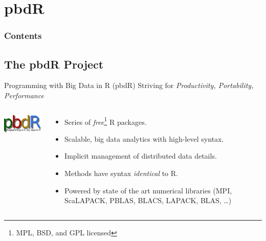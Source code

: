 \section{pbdR}

\hidenum
\begin{frame}[noframenumbering]
\frametitle{Contents}
 \tableofcontents[currentsection,hideothersubsections,sectionstyle=show/hide]
\end{frame}
\shownum


\subsection{The pbdR Project}


\begin{frame}
  \begin{block}{Programming with Big Data in R (pbdR)}
       \centering Striving for \emph{Productivity, Portability, Performance}\\[.4cm]\pause
  \begin{columns}[onlytextwidth]
    \begin{column}{0.30\textwidth}
      \centering
       \includegraphics[width=3.4cm]{pics/simple}\\[.2cm]
    \end{column}
    \begin{column}{0.65\textwidth}
  \begin{itemize}[<+-|alert@+>]
    \item Series of \emph{free}\footnote{MPL, BSD, and GPL licensed} R packages.
    \item Scalable, big data analytics with high-level syntax.
    \item Implicit management of distributed data details.
    \item Methods have syntax \emph{identical} to R.
    \item Powered by state of the art numerical libraries (MPI, ScaLAPACK, PBLAS, BLACS, LAPACK, BLAS, \dots)
  \end{itemize}
    \end{column}
​  \end{columns}
\end{block}
\end{frame}





